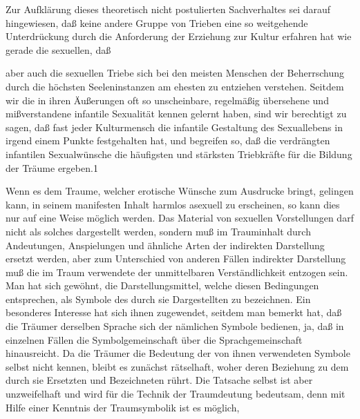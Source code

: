 \documentclass[twoside=true,titlepage=false,open=any, parskip=never, fontsize=10pt, headings=small, chapterprefix=false, appendixprefix=false]{scrbook}
\begin{document}
            
        \pstart
        Zur Aufklärung dieses theoretisch nicht postulierten Sachverhaltes sei darauf
               hingewiesen, daß keine andere Gruppe von Trieben eine so weitgehende
               Unterdrückung durch die Anforderung der Erziehung zur Kultur erfahren hat wie
               gerade die sexuellen, daß
        \pend
    
         
            
            
            
        \pstart
        aber auch die sexuellen Triebe sich bei den meisten Menschen der
               Beherrschung durch die höchsten Seeleninstanzen am ehesten zu entziehen
               verstehen. Seitdem wir die in ihren Äußerungen oft so unscheinbare, regelmäßig
               übersehene und mißverstandene
               infantile Sexualität kennen gelernt haben, sind
               wir berechtigt zu sagen, daß fast jeder Kulturmensch die infantile
               Gestaltung des Sexuallebens in irgend einem Punkte festgehalten hat, und
               begreifen so, daß die verdrängten infantilen Sexualwünsche die
               häufigsten und stärksten Triebkräfte für die Bildung der Träume ergeben.1
        \pend
    
            
        \pstart
        Wenn es dem Traume, welcher erotische Wünsche zum Ausdrucke bringt,
               gelingen kann, in seinem manifesten Inhalt harmlos asexuell zu
               erscheinen, so kann dies nur auf eine Weise möglich werden. Das Material von
               sexuellen Vorstellungen darf nicht als solches dargestellt werden, sondern muß
               im Trauminhalt durch Andeutungen, Anspielungen und ähnliche
               Arten der indirekten Darstellung ersetzt werden, aber zum Unterschied von
               anderen Fällen indirekter Darstellung muß die im Traum verwendete der
               unmittelbaren Verständlichkeit entzogen sein. Man hat sich gewöhnt, die
               Darstellungsmittel, welche diesen Bedingungen entsprechen, als Symbole des durch sie Dargestellten zu
               bezeichnen. Ein besonderes Interesse hat sich ihnen zugewendet, seitdem man
               bemerkt hat, daß die Träumer derselben Sprache sich der nämlichen
               Symbole bedienen, ja, daß in einzelnen Fällen die Symbolgemeinschaft über die
                  Sprachgemeinschaft hinausreicht. Da die Träumer die Bedeutung
               der von ihnen verwendeten Symbole selbst nicht kennen, bleibt es zunächst
               rätselhaft, woher deren Beziehung zu dem durch sie Ersetzten und Bezeichneten
               rührt. Die Tatsache selbst ist aber unzweifelhaft und wird für die Technik der
               Traumdeutung bedeutsam, denn mit Hilfe einer Kenntnis der
               Traumsymbolik ist es möglich,
        \pend
    
\end{document}
